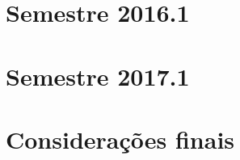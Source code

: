\subsection{\ProblemaI}

\section{Semestre 2016.1}

\section{Semestre 2017.1}

\section{Considerações finais}
